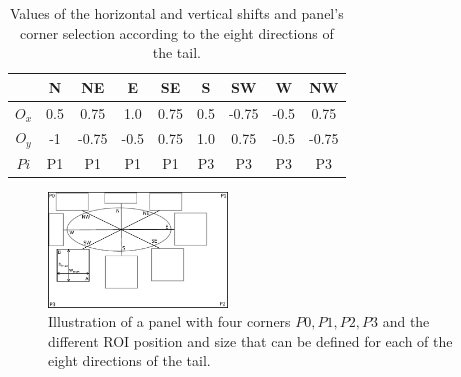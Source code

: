   \begin{table}[ht]
    \normalsize

    \centering
    \caption{Values of the horizontal and vertical shifts and panel's corner selection according to the eight directions of the tail.}
    \setlength{\tabcolsep}{.45em}
    \begin{tabular}{|c|c|c|c|c|c|c|c|c|}

          \hline
	      &  N  & NE  & E  & SE & S & SW & W & NW   \\
	      \hline
	      $O_x$   & 0.5  & 0.75 & 1.0  & 0.75 & 0.5 & -0.75& -0.5 & 0.75  \\
	      \hline
	      $O_y$   & -1   & -0.75& -0.5 & 0.75 & 1.0 & 0.75 & -0.5 & -0.75  \\
	      \hline
	      $Pi$    & P1   & P1   & P1   & P1   & P3  & P3   & P3   & P3   \\
          \hline
        \end{tabular}
    \label{tab:se:offset_panel_corner}
  \end{table}%




 \begin{figure}[!ht]
   \centering
  \includegraphics[width=180px]{roi_hypothesis.pdf}
  \caption[Illustration of the character region of interested computation for each of the eight directions of the tail]{Illustration of a panel with four corners $P0, P1, P2, P3$ and the different ROI position and size that can be defined for each of the eight directions of the tail.
  }
  \label{fig:se:roi_area}
 \end{figure}

